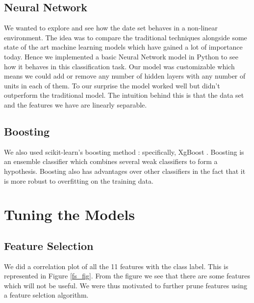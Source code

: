 \documentclass[conference]{IEEEtran}
\numberwithin{equation}{section}
\numberwithin{figure}{section}
\numberwithin{table}{section}
\begin{document}
\subsection{Neural Network}\label{sec:colour-illustrations}
We wanted to explore and see how the date set behaves in a non-linear environment. The idea was to compare the traditional techniques alongside some state of the art machine learning models which have gained a lot of importance today. Hence we implemented a basic Neural Network model in Python to see how it behaves in this classification task. Our model was customizable which means we could add or remove any number of hidden layers with any number of units in each of them. To our surprise the model worked well but didn't outperform the traditional model. The intuition behind this is that the data set and the features we have are linearly separable. 

\subsection{Boosting}
We also used scikit-learn's boosting method : specifically, XgBoost \cite{xgboost}. Boosting is an ensemble classifier which combines several weak classifiers to form a hypothesis. Boosting also has advantages over other classifiers in the fact that it is more robust to overfitting on the training data. 

\section{Tuning the Models}
\subsection{Feature Selection}
We did a correlation plot of all the 11 features with the class label. 
This is represented in Figure \ref{fs_fig}. From the figure we see that there are some features which will not be useful. We were thus motivated to further prune features using a feature selction algorithm.
\end{document}
